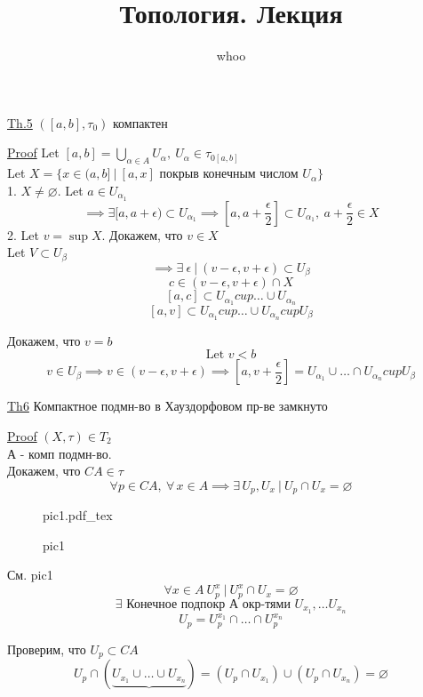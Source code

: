 \documentclass[a4paper]{article}
\newcommand{\incfig}[1]{%
\def\svgwidth{\columnwidth}
{#1.pdf_tex}
}
\begin{document}
\title{Топология. Лекция}
\author{whoo}
\maketitle

\begin{tcolorbox}
    \underline{Th.5} $ ([a,b], \tau_0) $ компактен 

    \underline{Proof} Let $ [a,b] = \bigcup_{\alpha \in A} U_{\alpha}, \ 
    U_{\alpha} \in \tau_{0[a,b]}$\\
    Let $ X = \{ x \in (a, b] \ | \ [a,x] \text{ покрыв конечным числом } U_\alpha \} $ \\
    1. $ X \neq \varnothing $. Let $ a \in U_{\alpha_1} $  
    \[
        \implies \exists [a,a+\epsilon) \subset U_{\alpha_1} \implies 
        [a, a + \frac{\epsilon}{2}] \subset U_{\alpha_1}, \ a + \frac{\epsilon}{2} \in X 
    \]
    2. Let $ v = \sup X $. Докажем, что $ v \in X $\\
    Let $ V \subset U_{\beta} $
    \[
        \implies \exists \ \epsilon \ | \ (v - \epsilon, v + \epsilon) \subset
        U_\beta
    \]
    \[
        c \in (v - \epsilon, v + \epsilon) \cap X
    \]
    \[
        [a,c] \subset U_{\alpha_1} cup \dots \cup U_{\alpha_n}
    \]
    \[
        [a,v] \subset U_{\alpha_1} cup \dots \cup U_{\alpha_n} cup U_\beta
    \]

    Докажем, что $ v = b $ 
    \[
        \text{Let } v < b
    \]
    \[
        v \in U_\beta \implies v \in (v - \epsilon, v + \epsilon) \implies
        [a, v + \frac{\epsilon}{2}] = U_{\alpha_1} \cup \dots \cap U_{\alpha_n} cup U_\beta
    \]
\end{tcolorbox}

\begin{tcolorbox}
\underline{Th6} Компактное подмн-во в Хауздорфовом пр-ве замкнуто

\underline{Proof} $ (X, \tau) \in T_2 $\\
А - комп подмн-во.\\
Докажем, что $ CA \in \tau $ 
\[
    \forall p \in CA, \ \forall \, x \in A \implies \exists \, U_p, U_x \ | \ 
    U_p \cap U_x = \varnothing
\]
\end{tcolorbox}

\begin{figure}[!ht]
    \centering
    \incfig{pic1}
    \caption{pic1}
    \label{fig:pic1}
\end{figure}
\begin{tcolorbox}
    См. pic1
\[
    \forall x \in A \ U_p^{x} \ | \ U_{p}^{x} \cap U_x = \varnothing
\]
\[
    \exists \text{ Конечное подпокр А окр-тями }U_{x_1}, \dots U_{x_n}
\]
\[
    U_p = U_p^{x_1} \cap \dots \cap U_{p}^{x_n}
\]

Проверим, что $ U_p \subset CA $ 
\[
    U_p \cap (\underbrace{U_{x_1}\cup \dots \cup U_{x_n}}) = 
    (U_p \cap U_{x_1}) \cup (U_p \cap U_{x_n}) = \varnothing
\]
\end{tcolorbox}
\end{document}
